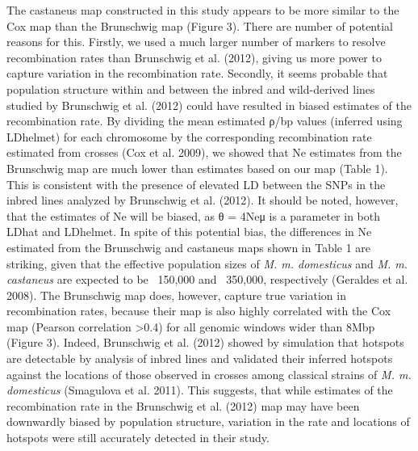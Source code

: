 The castaneus map constructed in this study appears to be more similar to the Cox map than the Brunschwig map (Figure 3). There are number of potential reasons for this. Firstly, we used a much larger number of markers to resolve recombination rates than Brunschwig et al. (2012), giving us more power to capture variation in the recombination rate. Secondly, it seems probable that population structure within and between the inbred and wild-derived lines studied by Brunschwig et al. (2012) could have resulted in biased estimates of the recombination rate. By dividing the mean estimated ρ/bp values (inferred using LDhelmet) for each chromosome by the corresponding recombination rate estimated from crosses (Cox et al. 2009), we showed that Ne estimates from the Brunschwig map are much lower than estimates based on our map (Table 1). This is consistent with the presence of elevated LD between the SNPs in the inbred lines analyzed by Brunschwig et al. (2012). It should be noted, however, that the estimates of Ne will be biased, as θ = 4Neμ is a parameter in both LDhat and LDhelmet. In spite of this potential bias, the differences in Ne estimated from the Brunschwig and castaneus maps shown in Table 1 are striking, given that the effective population sizes of \emph{M. m. domesticus} and \emph{M. m. castaneus} are expected to be ~150,000 and ~350,000, respectively (Geraldes et al. 2008). The Brunschwig map does, however, capture true variation in recombination rates, because their map is also highly correlated with the Cox map (Pearson correlation >0.4) for all genomic windows wider than 8Mbp (Figure 3). Indeed, Brunschwig et al. (2012) showed by simulation that hotspots are detectable by analysis of inbred lines and validated their inferred hotspots against the locations of those observed in crosses among classical strains of \emph{M. m. domesticus} (Smagulova et al. 2011). This suggests, that while estimates of the recombination rate in the Brunschwig et al. (2012) map may have been downwardly biased by population structure, variation in the rate and locations of hotspots were still accurately detected in their study.
 
